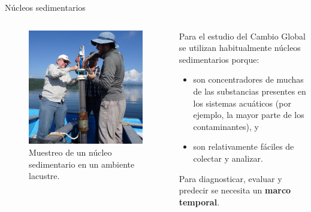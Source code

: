 \documentclass[9pt]{beamer}
\begin{document}
\begin{frame}{Núcleos sedimentarios}
	\begin{columns}
		\begin{column}{0.47\textwidth}
			\justifying
			\begin{figure}
			\centering	
			\includegraphics[height = 0.6\textheight]{Imagenes/DSC01875-CUADRADA.JPG}
			\caption{\justifying Muestreo de un núcleo sedimentario en un ambiente lacustre.}\label{Fig-MuestreoNucleoSed}
			\end{figure}
		\end{column}
		\begin{column}{0.47\textwidth}  
		\justifying Para el estudio del Cambio Global se utilizan habitualmente núcleos sedimentarios porque:
			\begin{itemize}
			\justifying
				\item son concentradores de muchas de las substancias presentes en los sistemas acuáticos (por ejemplo, la mayor parte de los contaminantes), y
				\item son relativamente fáciles de colectar y analizar. 
			\end{itemize}
			Para diagnosticar, evaluar y predecir se necesita un \textbf{marco temporal}.
		\end{column}

	\end{columns}
\end{frame}
\end{document}
